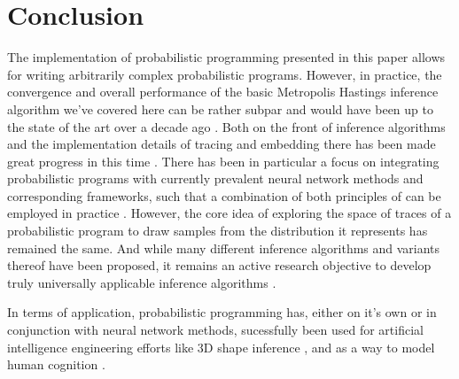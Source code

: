 \section{Conclusion}

The implementation of probabilistic programming presented in this paper allows for writing arbitrarily complex probabilistic programs. However, in practice, the convergence and overall performance of the basic Metropolis Hastings inference algorithm we've covered here can be rather subpar and would have been up to the state of the art over a decade ago \cite{wingate2011lightweight}. Both on the front of inference algorithms and the implementation details of tracing and embedding there has been made great progress in this time \cite{wood2014new} \cite{cusumano2019gen}. There has been in particular a focus on integrating probabilistic programs with currently prevalent neural network methods and corresponding frameworks, such that a combination of both principles of can be employed in practice \cite{bingham2019pyro} \cite{cusumano2019gen}. However, the core idea of exploring the space of traces of a probabilistic program to draw samples from the distribution it represents has remained the same. And while many different inference algorithms and variants thereof have been proposed, it remains an active research objective to develop truly universally applicable inference algorithms \cite{lew2023smcp3}.

In terms of application, probabilistic programming has, either on it's own or in conjunction with neural network methods, sucessfully been used for artificial intelligence engineering efforts like 3D shape inference \cite{mansinghka2013approximate} \cite{hoffman2023probnerf}, and as a way to model human cognition \cite{griffiths2010probabilistic} \cite{stuhlmuller2015modeling}.
